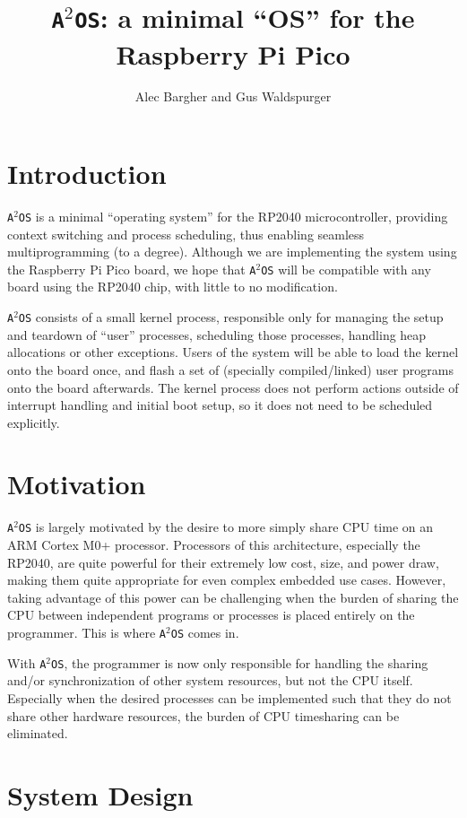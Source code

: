 \documentclass[12pt]{article}
\title{\texttt{A$^2$OS}: a minimal ``OS'' for the Raspberry Pi Pico}
\author{Alec Bargher and Gus Waldspurger}
\date{}
\newcommand{\os}{\texttt{A$^2$OS} }
\newcommand{\osns}{\texttt{A$^2$OS}}
\begin{document}
\maketitle

\section{Introduction}
\os is a minimal ``operating system'' for the RP2040 microcontroller, providing
context switching and process scheduling, thus enabling seamless
multiprogramming (to a degree). Although we are implementing the system using
the Raspberry Pi Pico board, we hope that \os will be compatible with any board
using the RP2040 chip, with little to no modification.
\vspace{1em}

\os consists of a small kernel process, responsible
only for managing the setup and teardown of ``user'' processes, scheduling those
processes, handling heap allocations or other exceptions. Users of the system
will be able to load the kernel onto the board once, and flash a set of
(specially compiled/linked) user programs onto the board afterwards. The kernel
process does not perform actions outside of interrupt handling and initial boot
setup, so it does not need to be scheduled explicitly.

\section{Motivation}

\os is largely motivated by the desire to more simply share CPU time on an ARM
Cortex M0+ processor. Processors of this architecture, especially the RP2040,
are quite powerful for their extremely low cost, size, and power draw, making
them quite appropriate for even complex embedded use cases. However, taking
advantage of this power can be challenging when the burden of sharing the CPU
between independent programs or processes is placed entirely on the programmer.
This is where \os comes in.

With \osns, the programmer is now only responsible for handling the sharing
and/or synchronization of other system resources, but not the CPU itself.
Especially when the desired processes can be implemented such that they do not
share other hardware resources, the burden of CPU timesharing can be eliminated.


\section{System Design}
\end{document}
